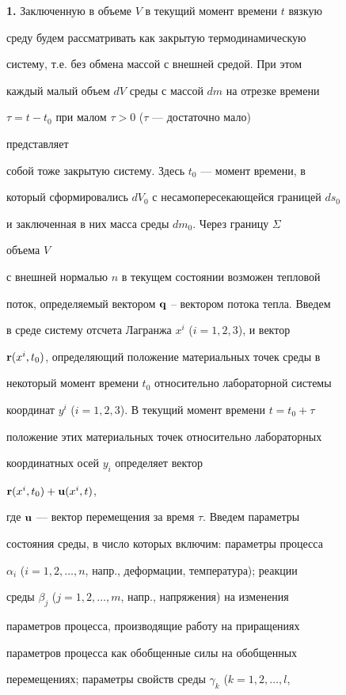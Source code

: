 {\bf 1.} Заключенную в объеме $V$ в текущий момент времени $t$ вязкую


среду будем рассматривать как закрытую термодинамическую


систему, т.е. без обмена массой с внешней средой. При этом


каждый малый объем $dV$ среды с массой $dm$ на отрезке времени


$\tau=t-t_0$ при малом $\tau>0$ ($\tau$ --- достаточно мало)


представляет


собой тоже закрытую систему. Здесь $t_0$ --- момент времени, в


который сформировались $dV_0$ с несамопересекающейся границей $ds_0$


и заключенная в них масса среды $dm_0$. Через границу $\Sigma$


объема $V$


с внешней нормалью $n$ в текущем состоянии возможен тепловой


поток, определяемый вектором $\bold q$ -- вектором потока тепла. Введем


в среде систему отсчета Лагранжа $x^i$ ($i=1,2,3$), и вектор


${\bold r}(x^i,t_0)$, определяющий положение материальных точек среды в


некоторый момент времени $t_0$ относительно лабораторной системы


координат $y^i$ ($i=1,2,3$). В текущий момент времени $t=t_0+\tau$


положение этих материальных точек относительно лабораторных


координатных осей $y_i$ определяет вектор


${\bold r}(x^i,t_0)+{\bold u}(x^i,t)$,


где $\bold u$ --- вектор перемещения за время $\tau$. Введем параметры


состояния среды, в число которых включим: параметры процесса


$\alpha_i$ ($i=1,2,\dotsc,n$, напр., деформации, температура); реакции


среды $\beta_j$ ($j=1,2,\dotsc,m$, напр., напряжения) на изменения


параметров процесса, производящие работу на приращениях


параметров процесса как обобщенные силы на обобщенных


перемещениях; параметры свойств среды $\gamma_k$ ($k=1,2,\dotsc,l$,


